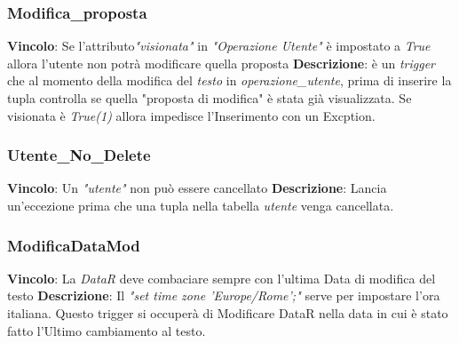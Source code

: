 
\hypertarget{Modificaproposta}{}
\subsubsection{Modifica\_proposta}
\textbf{Vincolo}: Se l'attributo\textit{"visionata"} in \textit{"Operazione Utente"} è impostato a \textit{True} allora l'utente non potrà modificare quella proposta\newline\newline
\textbf{Descrizione}: è un \textit{trigger} che al  momento della modifica del \textit{testo} in \textit{operazione\_utente}, prima di inserire la tupla controlla se quella "proposta di modifica" è stata già visualizzata. Se visionata è \textit{True(1)} allora impedisce l'Inserimento con un Excption.\newline




\hypertarget{UtenteNoDelete}{}
\subsubsection{Utente\_No\_Delete}
\textbf{Vincolo}: Un \textit{"utente"} non può essere cancellato\newline\newline
\textbf{Descrizione}: Lancia un'eccezione prima che una tupla nella tabella \textit{utente} venga cancellata.\newline




\hypertarget{ModificaDataMod}{}
\subsubsection{ModificaDataMod}
\textbf{Vincolo}: La \textit{DataR} deve combaciare sempre con l'ultima Data di modifica del testo\newline\newline
\textbf{Descrizione}: Il \textit{"set time zone 'Europe/Rome';"} serve per impostare l'ora italiana. Questo trigger si occuperà di Modificare DataR nella data in cui è stato fatto l'Ultimo cambiamento al testo. \newline


